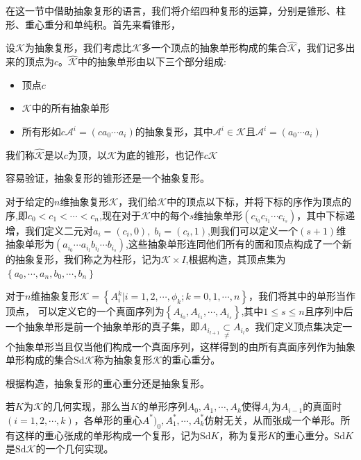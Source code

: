 在这一节中借助抽象复形的语言，我们将介绍四种复形的运算，分别是锥形、柱形、重心重分和单纯积。首先来看锥形，
\begin{definition}[锥形]
设$\mathcal{K}$为抽象复形，我们考虑比$\mathcal{K}$多一个顶点的抽象单形构成的集合$\hat{\mathcal{K}}$，我们记多出来的顶点为$c$。$\hat{\mathcal{K}}$中的抽象单形由以下三个部分组成:
\begin{itemize}
    \item 顶点$c$
    \item $\mathcal{K}$中的所有抽象单形
    \item 所有形如$c\mathcal{A}^{i}=(ca_{0}\cdots a_{i})$的抽象复形，其中$\mathcal{A}^{i}\in \mathcal{K}$且$\mathcal{A}^{i}=(a_{0}\cdots a_{i})$
    \end{itemize}
我们称$\hat{\mathcal{K}}$是以$c$为顶，以$\mathcal{K}$为底的锥形，也记作$c\mathcal{K}$
\end{definition}
容易验证，抽象复形的锥形还是一个抽象复形。
\begin{definition}[柱形]
对于给定的$n$维抽象复形$\mathcal{K}$，我们给$\mathcal{K}$中的顶点以下标，并将下标的序作为顶点的序,即$c_{0}<c_{1}<\cdots<c_{n}$,现在对于$\mathcal{K}$中的每个$s$维抽象单形$(c_{i_{0}}c_{i_{1}}\cdots c_{i_{s}})$，其中下标递增，我们定义二元对$a_{i}=(c_{i},0),\;b_{i}=(c_{i},1)$,则我们可以定义一个$(s+1)$维抽象单形为$(a_{i_{0}}\cdots a_{i_{l}}b_{i_{l}}\cdots b_{i_{s}})$,这些抽象单形连同他们所有的面和顶点构成了一个新的抽象复形，我们称之为柱形，记为$\mathcal{K}\times I$,根据构造，其顶点集为$\left\{a_{0},\cdots,a_{n},b_{0},\cdots,b_{n}\right\}$
\end{definition}
\begin{definition}[重心重分]
对于$n$维抽象复形$\mathcal{K}=\left\{A^{k}_{i}|i=1,2,\cdots,\phi_{k};k=0,1,\cdots,n\right\}$，我们将其中的单形当作顶点，
可以定义它的一个真面序列为$\left\{A_{i_{0}},A_{i_{1}},\cdots,A_{i_{s}}\right\}$,其中$1\leq s\leq n$且序列中后一个抽象单形是前一个抽象单形的真子集，即$A_{i_{l+1}}\mathop{\subset}\limits_{\neq}A_{i_{l}}$。我们定义顶点集决定一个抽象单形当且仅当他们构成一个真面序列，这样得到的由所有真面序列作为抽象单形构成的集合$\text{Sd}\mathcal{K}$称为抽象复形$\mathcal{K}$的重心重分。
\end{definition}
根据构造，抽象复形的重心重分还是抽象复形。
\begin{proposition}
若$K$为$\mathcal{K}$的几何实现，那么当$K$的单形序列$A_{0},A_{1},\cdots,A_{k}$使得$A_{i}$为$A_{i-1}$的真面时$(i=1,2,\cdots,k)$，各单形的重心$A^{*})_{0},A^{*}_{1},\cdots,A^{*}_{k}$仿射无关，从而张成一个单形。所有这样的重心张成的单形构成一个复形，记为$\text{Sd}K$，称为复形$K$的重心重分。$\text{Sd}K$是$\text{Sd}\mathcal{K}$的一个几何实现。
\end{proposition}
